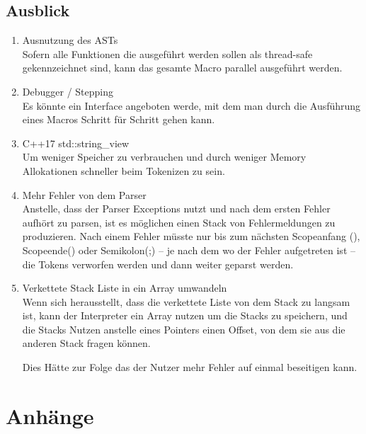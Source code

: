   \subsection{Ausblick}
  \label{ssec:Ausblick}
    \begin{enumerate}[ref=Ausblick: Punkt \arabic*]
      \item Ausnutzung des ASTs\\
        Sofern alle Funktionen die ausgeführt werden sollen als thread-safe gekennzeichnet sind, kann das gesamte Macro parallel ausgeführt werden.
      \item Debugger / Stepping\\
        Es könnte ein Interface angeboten werde, mit dem man durch die Ausführung eines Macros Schritt für Schritt gehen kann.
      \item C++17 std::string\_view\\
        Um weniger Speicher zu verbrauchen und durch weniger Memory Allokationen schneller beim Tokenizen zu sein.
      \item Mehr Fehler von dem Parser\label{enum:Mehr Fehler}\\
        Anstelle, dass der Parser Exceptions nutzt und nach dem ersten Fehler aufhört zu parsen, ist es möglichen einen Stack von Fehlermeldungen zu produzieren. Nach einem Fehler müsste nur bis zum nächsten Scopeanfang ({), Scopeende(}) oder Semikolon(;) -- je nach dem wo der Fehler aufgetreten ist -- die Tokens verworfen werden und dann weiter geparst werden.
      \item Verkettete Stack Liste in ein Array umwandeln\label{enum:linkedlist}\\
        Wenn sich herausstellt, dass die verkettete Liste von dem Stack zu langsam ist, kann der Interpreter ein Array nutzen um die Stacks zu speichern, und die Stacks Nutzen anstelle eines Pointers einen Offset, von dem sie aus die anderen Stack fragen können.

        Dies Hätte zur Folge das der Nutzer mehr Fehler auf einmal beseitigen kann.
    \end{enumerate}


\printbibliography
\listoffigures
\listofmyCodeEnvTypes
{} %


\section*{Anhänge}
\label{sec:Anhänge}


